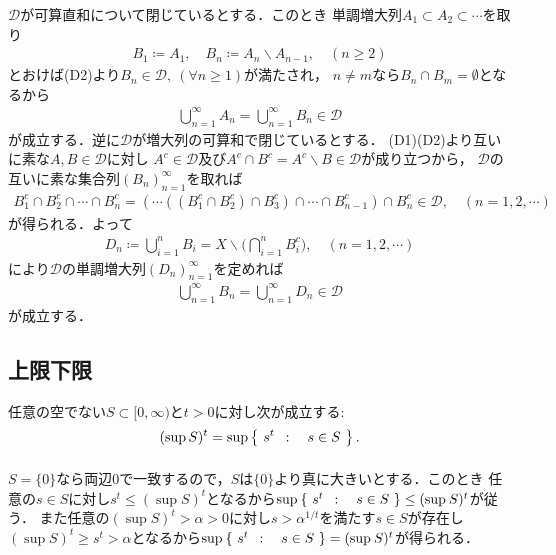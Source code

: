 	\begin{prf}
		$\mathscr{D}$が可算直和について閉じているとする．このとき
		単調増大列$A_1 \subset A_2 \subset \cdots$を取り
		\begin{align}
			B_1 \coloneqq A_1,
			\quad B_n \coloneqq A_n \backslash A_{n-1},
			\quad (n \geq 2)
		\end{align}
		とおけば(D2)より$B_n \in \mathscr{D},\ (\forall n \geq 1)$が満たされ，
		$n \neq m$なら$B_n \cap B_m = \emptyset$となるから
		\begin{align}
			\bigcup_{n=1}^{\infty} A_n = \bigcup_{n=1}^{\infty} B_n \in \mathscr{D} 
		\end{align}
		が成立する．逆に$\mathscr{D}$が増大列の可算和で閉じているとする．
		(D1)(D2)より互いに素な$A,B \in \mathscr{D}$に対し
		$A^c \in \mathscr{D}$及び$A^c \cap B^c = A^c \backslash B\in \mathscr{D}$が成り立つから，
		$\mathscr{D}$の互いに素な集合列$(B_n)_{n=1}^{\infty}$を取れば
		\begin{align}
			B_1^c \cap B_2^c \cap \cdots \cap B_n^c
			= \left( \cdots \left( \left( B_1^c \cap B_2^c \right) \cap B_3^c \right) \cap \cdots \cap B_{n-1}^c \right) \cap B_n^c
			\in \mathscr{D},
			\quad (n=1,2,\cdots)
		\end{align}
		が得られる．よって
		\begin{align}
			D_n \coloneqq \bigcup_{i=1}^n B_i = X \backslash \Biggl( \bigcap_{i=1}^n B_i^c \Biggr),
			\quad (n=1,2,\cdots)
		\end{align}
		により$\mathscr{D}$の単調増大列$(D_n)_{n=1}^{\infty}$を定めれば
		\begin{align}
			\bigcup_{n=1}^{\infty} B_n = \bigcup_{n=1}^{\infty} D_n \in \mathscr{D}
		\end{align}
		が成立する．
		\QED
	\end{prf}

\subsection{上限下限}
	\begin{screen}
		\begin{thm}[上限の冪と冪の上限]\label{thm:exponentiation_of_supremum_supremum_of_exponentiation}
			任意の空でない$S \subset [0,\infty)$と$t > 0$に対し次が成立する:
			\begin{align}
				(\operatorname*{sup}_{} S)^t = \operatorname*{sup}_{} \left\{\ s^t\ \, : \quad s \in S\ \right\}.
			\end{align}
		\end{thm}
	\end{screen}
	
	\begin{prf}
		$S=\{0\}$なら両辺0で一致するので，$S$は$\{0\}$より真に大きいとする．このとき
		任意の$s \in S$に対し$s^t \leq (\sup{}{S})^t$となるから$\operatorname*{sup}_{} \left\{\ s^t\ \, : \quad s \in S\ \right\} \leq (\operatorname*{sup}_{} S)^t$が従う．
		また任意の$(\sup{}{S})^t > \alpha > 0$に対し$s > \alpha^{1/t}$を満たす$s \in S$が存在し
		$(\sup{}{S})^t \geq s^t > \alpha$となるから$\operatorname*{sup}_{} \left\{\ s^t\ \, : \quad s \in S\ \right\} = (\operatorname*{sup}_{} S)^t$が得られる．
		\QED
	\end{prf}
